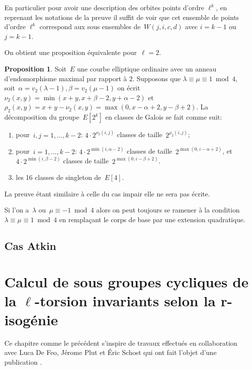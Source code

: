 \documentclass[10pt,a4paper]{book}
\theoremstyle{plain}
\theoremstyle{definition}
\theoremstyle{definition}
\theoremstyle{definition}
\newtheorem{prop}[thm]{Proposition}
\theoremstyle{definition}
\theoremstyle{remark}
\theoremstyle{remark}
\theoremstyle{definition}
\begin{document}
En particulier pour avoir une description des orbites points d'ordre $\ell^k$, en reprenant les notations de la preuve il suffit de voir que cet ensemble de points d'ordre $\ell^k$ correspond aux sous ensembles de~$W(j,i,c,d)$ avec $i=k-1$ ou $j=k-1$. 

On obtient une proposition équivalente pour~$\ell = 2$.


\begin{prop}\label{prop:orbites-2-torsion}
Soit~$E$ une courbe elliptique ordinaire avec un anneau d'endomorphisme maximal
 par rapport à $2$.
Supposons que $\lambda \equiv \mu \equiv 1 \bmod4 $, soit~$\alpha = v_2(\lambda-1), \beta=v_2(\mu-1)$
on écrit~$\nu_2(x, y) = \min (x+y, x+\beta-2, y+\alpha-2)$
et~$\rho_2(x, y) = x+y - \nu_2(x, y) = \max (0, x-\alpha+2, y-\beta+2)$.
La décomposition du groupe~$E[2^k]$ en classes de Galois se fait comme suit:
\begin{enumerate}
\item pour~$i, j = 1, …, k-2$:
$4 \cdot 2^{\nu_2(i,j)}$ classes de taille~$2^{\rho_2(i,j)}$;
\item pour~$i = 1, …, k-2$:
$4 \cdot 2^{\min (i, \alpha-2)}$ classes de taille~$2^{\max (0, i-\alpha+2)}$, et
$4 \cdot 2^{\min (i, \beta-2)}$ classes de taille~$2^{\max (0, i-\beta+2)}$.
\item les 16 classes de singleton de~$E[4]$.
\end{enumerate}
\end{prop}
La preuve étant similaire à celle du cas impair elle ne sera pas écrite.

Si l'on a~$\lambda$ ou~$\mu \equiv -1 \bmod 4$ alors
on peut toujours se ramener à la condition $\lambda \equiv \mu \equiv 1 \bmod 4$
en remplaçant le corps de base par une extension quadratique.



\section{Cas Atkin}

\chapter{Calcul de sous groupes cycliques de la $\ell$-torsion invariants selon la r-isogénie}
\label{cha:con:poi}
Ce chapitre comme le précédent s'inspire de travaux effectués en collaboration avec Luca De Feo, J\'erome Plut et \'Eric Schost qui ont fait l'objet d'une publication \cite{Defeo_Plut_Schost_2016}.
\end{document}
